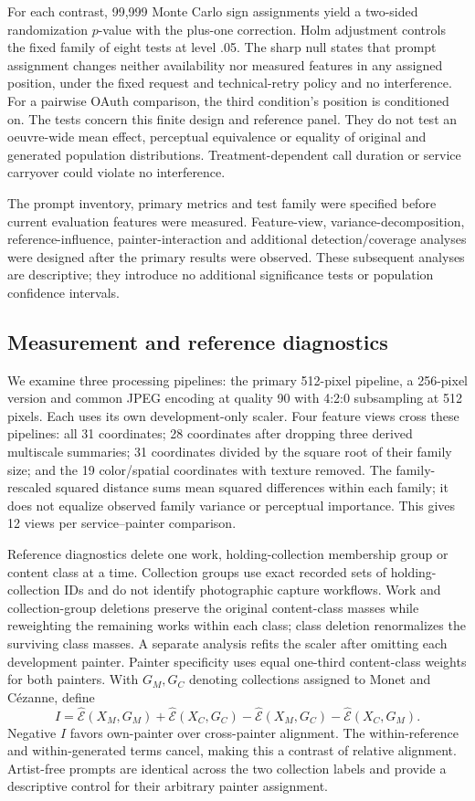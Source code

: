 \documentclass[11pt]{article}
\newcommand{\E}{\widehat{\mathcal E}}
\begin{document}
For each contrast, 99,999 Monte Carlo sign assignments yield a two-sided
randomization $p$-value with the plus-one correction. Holm adjustment controls
the fixed family of eight tests at level .05. The sharp null states that prompt
assignment changes neither availability nor measured features in any assigned
position, under the fixed request and technical-retry policy and no interference.
For a pairwise OAuth comparison, the third condition's position is conditioned
on. The tests concern this finite design and reference panel. They do not test
an oeuvre-wide mean effect, perceptual equivalence or equality of original and
generated population distributions. Treatment-dependent call duration or service
carryover could violate no interference.

The prompt inventory, primary metrics and test family were specified before
current evaluation features were measured. Feature-view, variance-decomposition,
reference-influence, painter-interaction and additional detection/coverage
analyses were designed after the primary results were observed. These subsequent
analyses are descriptive; they introduce no additional significance tests or
population confidence intervals.

\subsection{Measurement and reference diagnostics}
We examine three processing pipelines: the primary 512-pixel pipeline, a
256-pixel version and common JPEG encoding at quality 90 with 4:2:0 subsampling
at 512 pixels. Each uses its own development-only scaler. Four feature views
cross these pipelines: all 31 coordinates; 28 coordinates after dropping three
derived multiscale summaries; 31 coordinates divided by the square root of their
family size; and the 19 color/spatial coordinates with texture removed. The
family-rescaled squared distance sums mean squared differences within each
family; it does not equalize observed family variance or perceptual importance.
This gives 12 views per service--painter comparison.

Reference diagnostics delete one work, holding-collection membership group or
content class at a time. Collection groups use exact recorded sets of holding-
collection IDs and do not identify photographic capture workflows. Work and
collection-group deletions preserve the original content-class masses while
reweighting the remaining works within each class; class deletion renormalizes
the surviving class masses. A separate
analysis refits the scaler after omitting each development
painter. Painter specificity uses equal one-third content-class weights for
both painters. With $G_M,G_C$ denoting collections assigned to Monet and
C\'ezanne, define
\begin{equation}
I=\E(X_M,G_M)+\E(X_C,G_C)-\E(X_M,G_C)-\E(X_C,G_M).
\label{eq:specificity}
\end{equation}
Negative $I$ favors own-painter over cross-painter alignment. The within-reference
and within-generated terms cancel, making this a contrast of relative alignment.
Artist-free prompts are identical across the two collection labels and provide
a descriptive control for their arbitrary painter assignment.
\end{document}
